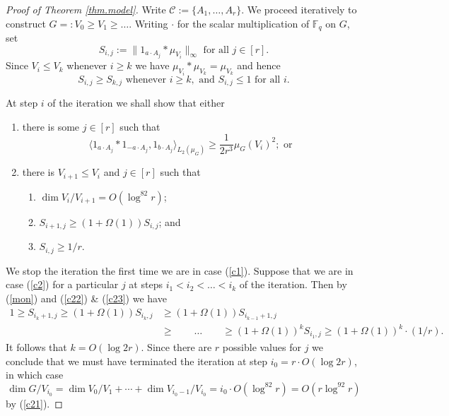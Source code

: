 \documentclass[12pt,reqno]{amsart}
\providecommand{\F}{\mathbb{F}}
\numberwithin{equation}{section}
\begin{document}
\begin{proof}[Proof of Theorem \ref{thm.model}]
Write $\mathcal{C}:=\{A_1,\dots,A_r\}$. We proceed iteratively to construct $G=:V_0 \geq V_1\geq \dots$. Writing $\cdot$ for the scalar multiplication of $\F_q$ on $G$, set
\begin{equation*}
S_{i,j}:=\|1_{a\cdot A_j}\ast \mu_{V_i}\|_\infty \text{ for all } j \in [r].
\end{equation*}
Since $V_i \leq V_{k}$ whenever $i \geq k$ we have $\mu_{V_i} \ast \mu_{V_k} = \mu_{V_k}$ and hence
\begin{equation}\label{mon}
S_{i,j} \geq S_{k,j}\text{ whenever }i \geq k, \text{ and } S_{i,j} \leq 1 \text{ for all }i.
\end{equation}

At step $i$ of the iteration we shall show that either
\begin{enumerate}
\item\label{c1} there is some $j \in [r]$ such that
\begin{equation*}
\langle 1_{a\cdot A_j} \ast 1_{-a\cdot A_j},1_{b \cdot A_j}\rangle_{L_2(\mu_G)} \geq \frac{1}{2r^3}\mu_G(V_i)^2;\text{ or }
\end{equation*}
\item\label{c2} there is $V_{i+1} \leq V_i$ and $j \in [r]$ such that
\begin{enumerate}
\item\label{c21} $\dim V_i/V_{i+1} =O(\log^82r)$;
\item\label{c22} $S_{i+1,j} \geq (1+\Omega(1))S_{i,j}$; and
\item\label{c23} $S_{i,j} \geq 1/r$.
\end{enumerate}
\end{enumerate}
We stop the iteration the first time we are in case (\ref{c1}). Suppose that we are in case (\ref{c2}) for a particular $j$ at steps $i_1 <i_2<\dots < i_k$ of the iteration. Then by (\ref{mon}) and (\ref{c22}) \& (\ref{c23}) we have
\begin{align*}
1 \geq S_{i_k+1,j} \geq (1+\Omega(1))S_{i_k,j} & \geq (1+\Omega(1))S_{i_{k-1}+1,j}\\ & \geq \qquad \dots \qquad  \geq (1+\Omega(1))^kS_{i_1,j} \geq (1+\Omega(1))^k\cdot (1/r).
\end{align*}
It follows that $k=O(\log 2r)$. Since there are $r$ possible values for $j$ we conclude that we must have terminated the iteration at step $i_0=r\cdot O(\log 2r)$, in which case
\begin{equation*}
\dim G/V_{i_0} =\dim V_0/V_1 + \cdots + \dim V_{i_0-1}/V_{i_0} =i_0\cdot O(\log^82r) = O(r\log^92r)
\end{equation*} by (\ref{c21}).


\end{proof}
\end{document}
